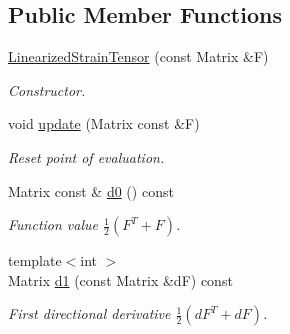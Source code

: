 \subsection*{Public Member Functions}
\begin{DoxyCompactItemize}
\item 
\hyperlink{classFunG_1_1LinearAlgebra_1_1LinearizedStrainTensor_a5b286c1fca2dd48ea62a9f283304395d}{Linearized\-Strain\-Tensor} (const Matrix \&F)
\begin{DoxyCompactList}\small\item\em Constructor. \end{DoxyCompactList}\item 
\hypertarget{classFunG_1_1LinearAlgebra_1_1LinearizedStrainTensor_a7a5c2dab4a5faa694bd0882da1e426db}{void \hyperlink{classFunG_1_1LinearAlgebra_1_1LinearizedStrainTensor_a7a5c2dab4a5faa694bd0882da1e426db}{update} (Matrix const \&F)}\label{classFunG_1_1LinearAlgebra_1_1LinearizedStrainTensor_a7a5c2dab4a5faa694bd0882da1e426db}

\begin{DoxyCompactList}\small\item\em Reset point of evaluation. \end{DoxyCompactList}\item 
\hypertarget{classFunG_1_1LinearAlgebra_1_1LinearizedStrainTensor_a4d2fc7056df0a959a815105e6a4a5ea8}{Matrix const \& \hyperlink{classFunG_1_1LinearAlgebra_1_1LinearizedStrainTensor_a4d2fc7056df0a959a815105e6a4a5ea8}{d0} () const }\label{classFunG_1_1LinearAlgebra_1_1LinearizedStrainTensor_a4d2fc7056df0a959a815105e6a4a5ea8}

\begin{DoxyCompactList}\small\item\em Function value $ \frac{1}{2}\left(F^T+F\right) $. \end{DoxyCompactList}\item 
\hypertarget{classFunG_1_1LinearAlgebra_1_1LinearizedStrainTensor_ae6f9f01b7d1d1ce365f4e177df6e7b8b}{{\footnotesize template$<$int $>$ }\\Matrix \hyperlink{classFunG_1_1LinearAlgebra_1_1LinearizedStrainTensor_ae6f9f01b7d1d1ce365f4e177df6e7b8b}{d1} (const Matrix \&d\-F) const }\label{classFunG_1_1LinearAlgebra_1_1LinearizedStrainTensor_ae6f9f01b7d1d1ce365f4e177df6e7b8b}

\begin{DoxyCompactList}\small\item\em First directional derivative $ \frac{1}{2}\left(dF^T+dF\right) $. \end{DoxyCompactList}\end{DoxyCompactItemize}



